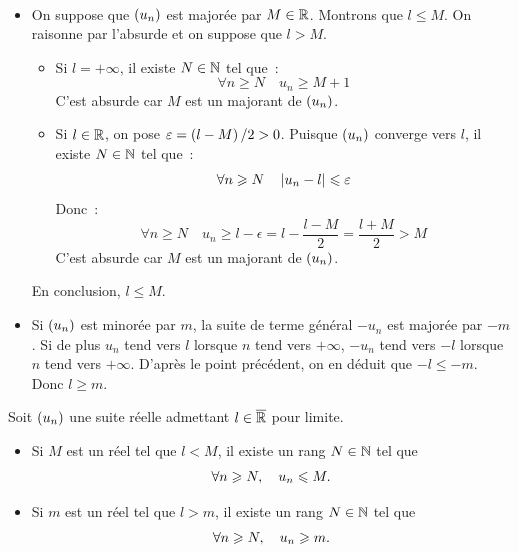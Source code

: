 \documentclass{magnolia}
\begin{document}
\begin{preuve}
$\quad$
\begin{itemize}
\item On suppose que $\left(u_n\right)$ est majorée par $M\in\mathbb{R}$. Montrons que
  $l\leq M$. On raisonne par l'absurde et on suppose que $l>M$.
  \begin{itemize}
  \item Si $l=+\infty$, il existe $N\in\mathbb{N}$ tel que~:
    \[\forall n\geq N \quad u_n \geq M+1\]
    C'est absurde car $M$ est un majorant de $\left(u_n\right)$.
  \item Si $l\in\mathbb{R}$, on pose $\varepsilon=\left(l-M\right)/2>0$. Puisque $\left(u_n\right)$ converge
    vers $l$, il existe $N\in\mathbb{N}$ tel que~:
    \[\forall n\geqslant N \quad \left|u_n-l\right|\leqslant \varepsilon\]
    Donc~:
    \[\forall n\geq N \quad u_n \geq l-\epsilon=l-\frac{l-M}{2}=
      \frac{l+M}{2}>M\]
    C'est absurde car $M$ est un majorant de $\left(u_n\right)$.
  \end{itemize}
  En conclusion, $l \leq M$.
\item Si $\left(u_n\right)$ est minorée par $m$, la suite de terme général $-u_n$ est
  majorée par $-m$. Si de plus $u_n$ tend vers $l$ lorsque $n$ tend vers
  $+\infty$, $-u_n$ tend vers $-l$ lorsque $n$ tend vers $+\infty$. D'après
  le point précédent, on en déduit que $-l \leq -m$. Donc $l \geq m$.
\end{itemize}
\end{preuve}


\begin{proposition}[utile=-3]
Soit $\left(u_n\right)$ une suite réelle admettant $l\in\overline{\mathbb{R}}$ pour limite.
\begin{itemize}
\item Si $M$ est un réel tel que $l<M$, il existe un rang $N\in\mathbb{N}$ tel que
  \[\forall n\geqslant N ,\quad u_n \leqslant M.\]
\item Si $m$ est un réel tel que $l>m$, il existe un rang $N\in\mathbb{N}$ tel que
  \[\forall n\geqslant N ,\quad u_n \geqslant m.\]
\end{itemize}
\end{proposition}
\end{document}
